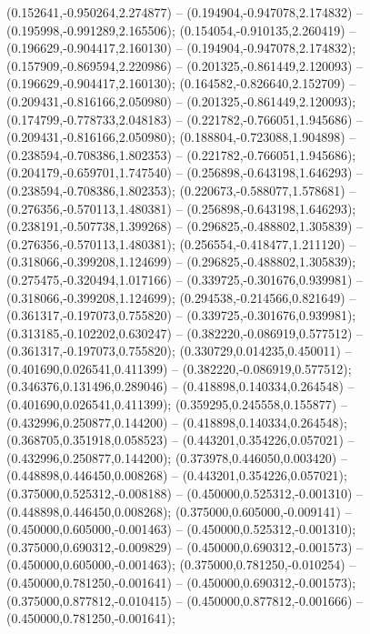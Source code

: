  (0.152641,-0.950264,2.274877) -- (0.194904,-0.947078,2.174832) -- (0.195998,-0.991289,2.165506);
 (0.154054,-0.910135,2.260419) -- (0.196629,-0.904417,2.160130) -- (0.194904,-0.947078,2.174832);
 (0.157909,-0.869594,2.220986) -- (0.201325,-0.861449,2.120093) -- (0.196629,-0.904417,2.160130);
 (0.164582,-0.826640,2.152709) -- (0.209431,-0.816166,2.050980) -- (0.201325,-0.861449,2.120093);
 (0.174799,-0.778733,2.048183) -- (0.221782,-0.766051,1.945686) -- (0.209431,-0.816166,2.050980);
 (0.188804,-0.723088,1.904898) -- (0.238594,-0.708386,1.802353) -- (0.221782,-0.766051,1.945686);
 (0.204179,-0.659701,1.747540) -- (0.256898,-0.643198,1.646293) -- (0.238594,-0.708386,1.802353);
 (0.220673,-0.588077,1.578681) -- (0.276356,-0.570113,1.480381) -- (0.256898,-0.643198,1.646293);
 (0.238191,-0.507738,1.399268) -- (0.296825,-0.488802,1.305839) -- (0.276356,-0.570113,1.480381);
 (0.256554,-0.418477,1.211120) -- (0.318066,-0.399208,1.124699) -- (0.296825,-0.488802,1.305839);
 (0.275475,-0.320494,1.017166) -- (0.339725,-0.301676,0.939981) -- (0.318066,-0.399208,1.124699);
 (0.294538,-0.214566,0.821649) -- (0.361317,-0.197073,0.755820) -- (0.339725,-0.301676,0.939981);
 (0.313185,-0.102202,0.630247) -- (0.382220,-0.086919,0.577512) -- (0.361317,-0.197073,0.755820);
 (0.330729,0.014235,0.450011) -- (0.401690,0.026541,0.411399) -- (0.382220,-0.086919,0.577512);
 (0.346376,0.131496,0.289046) -- (0.418898,0.140334,0.264548) -- (0.401690,0.026541,0.411399);
 (0.359295,0.245558,0.155877) -- (0.432996,0.250877,0.144200) -- (0.418898,0.140334,0.264548);
 (0.368705,0.351918,0.058523) -- (0.443201,0.354226,0.057021) -- (0.432996,0.250877,0.144200);
 (0.373978,0.446050,0.003420) -- (0.448898,0.446450,0.008268) -- (0.443201,0.354226,0.057021);
 (0.375000,0.525312,-0.008188) -- (0.450000,0.525312,-0.001310) -- (0.448898,0.446450,0.008268);
 (0.375000,0.605000,-0.009141) -- (0.450000,0.605000,-0.001463) -- (0.450000,0.525312,-0.001310);
 (0.375000,0.690312,-0.009829) -- (0.450000,0.690312,-0.001573) -- (0.450000,0.605000,-0.001463);
 (0.375000,0.781250,-0.010254) -- (0.450000,0.781250,-0.001641) -- (0.450000,0.690312,-0.001573);
 (0.375000,0.877812,-0.010415) -- (0.450000,0.877812,-0.001666) -- (0.450000,0.781250,-0.001641);

